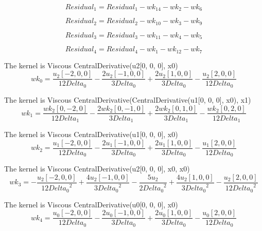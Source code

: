 \documentclass{article}
\begin{document}
\begin{dmath}{Residual_{1}} = {Residual_{1}} - {wk_{14}} - {wk_{2}} - 
{wk_{6}}\end{dmath}

\begin{dmath}{Residual_{2}} = {Residual_{2}} - {wk_{10}} - {wk_{3}} - 
{wk_{9}}\end{dmath}

\begin{dmath}{Residual_{3}} = {Residual_{3}} - {wk_{11}} - {wk_{4}} - 
{wk_{5}}\end{dmath}

\begin{dmath}{Residual_{4}} = {Residual_{4}} - {wk_{1}} - {wk_{12}} - 
{wk_{7}}\end{dmath}

The kernel is Viscous CentralDerivative(u2[0, 0, 0], x0) \begin{dmath}{wk_{0}} = \frac{{u_{2}}[{-2,0,0}]}{12 Delta_0} - \frac{2 
{u_{2}}[{-1,0,0}]}{3 Delta_0} + \frac{2 {u_{2}}[{1,0,0}]}{3 Delta_0} - 
\frac{{u_{2}}[{2,0,0}]}{12 Delta_0}\end{dmath}

The kernel is Viscous CentralDerivative(CentralDerivative(u1[0, 0, 0], x0), x1) \begin{dmath}{wk_{1}} = \frac{{wk_{2}}[{0,-2,0}]}{12 Delta_1} - 
\frac{2 {wk_{2}}[{0,-1,0}]}{3 Delta_1} + \frac{2 {wk_{2}}[{0,1,0}]}{3 
Delta_1} - \frac{{wk_{2}}[{0,2,0}]}{12 Delta_1}\end{dmath}

The kernel is Viscous CentralDerivative(u1[0, 0, 0], x0) \begin{dmath}{wk_{2}} = \frac{{u_{1}}[{-2,0,0}]}{12 Delta_0} - \frac{2 
{u_{1}}[{-1,0,0}]}{3 Delta_0} + \frac{2 {u_{1}}[{1,0,0}]}{3 Delta_0} - 
\frac{{u_{1}}[{2,0,0}]}{12 Delta_0}\end{dmath}

The kernel is Viscous CentralDerivative(u2[0, 0, 0], x0, x0) \begin{dmath}{wk_{3}} = - \frac{{u_{2}}[{-2,0,0}]}{12 {Delta_0}^{2}} + 
\frac{4 {u_{2}}[{-1,0,0}]}{3 {Delta_0}^{2}} - \frac{5 {u_{2}}}{2 
{Delta_0}^{2}} + \frac{4 {u_{2}}[{1,0,0}]}{3 {Delta_0}^{2}} - 
\frac{{u_{2}}[{2,0,0}]}{12 {Delta_0}^{2}}\end{dmath}

The kernel is Viscous CentralDerivative(u0[0, 0, 0], x0) \begin{dmath}{wk_{4}} = \frac{{u_{0}}[{-2,0,0}]}{12 Delta_0} - \frac{2 
{u_{0}}[{-1,0,0}]}{3 Delta_0} + \frac{2 {u_{0}}[{1,0,0}]}{3 Delta_0} - 
\frac{{u_{0}}[{2,0,0}]}{12 Delta_0}\end{dmath}
\end{document}
